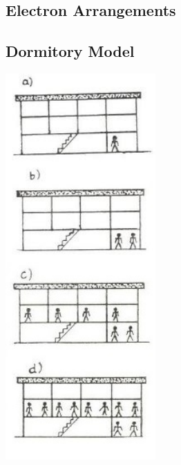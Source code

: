\begin{multicols}{2}
\vfill
\columnbreak


\section*{Electron Arrangements}


\subsection{Dormitory Model}

\begin{center}
\includegraphics[width=0.43\textwidth]{./img/source/dorm-arrangement.jpg}
\end{center}


\end{multicols}

